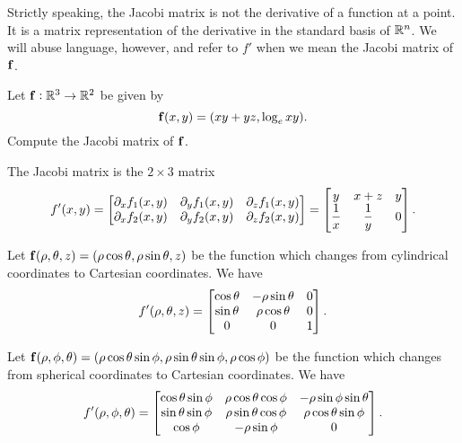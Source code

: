 \begin{rem}
Strictly speaking, the Jacobi matrix is not the derivative of a
function at a point. It is a matrix representation of the derivative
in the standard basis of $\mathbb{R}^n$. We will abuse language,
however, and refer to $f'$ when we mean the Jacobi matrix of $\mathbf{ f}$.
\end{rem}

\begin{exa}
Let $\mathbf{ f}:\mathbb{R}^3 \rightarrow \mathbb{R}^2$ be given by
$$\mathbf{ f}(x,y) = (xy + yz, \log_e xy).$$
Compute the Jacobi matrix of $\mathbf{ f}$.
\end{exa}
\begin{solu} The Jacobi matrix is the $2\times 3$ matrix
$$f'(x,y) = \begin{bmatrix} \partial_x f_1(x,y) &
\partial_y f_1(x,y) & \partial_z f_1(x,y) \cr
\partial_x f_2(x,y) & \partial_y f_2(x,y) &
\partial_z f_2(x,y) \cr \end{bmatrix} = \begin{bmatrix} y
& x + z & y \cr \dfrac{1}{x} & \dfrac{1}{y} & 0\cr
 \end{bmatrix}.$$
\end{solu}
\begin{exa}
Let $\mathbf{ f}(\rho, \theta, z)    = (\rho\cos\theta, \rho\sin\theta, z)$ be
the function which changes from cylindrical coordinates to Cartesian
coordinates. We have
$$f'(\rho, \theta, z) = \begin{bmatrix} \cos\theta
& -\rho\sin\theta & 0 \cr \sin\theta & \rho\cos\theta & 0 \cr 0 &
0 & 1 \cr
\end{bmatrix}.$$
\label{exa:jacobicylindrical}\end{exa}
\begin{exa}
Let $\mathbf{ f}(\rho, \phi, \theta)    = (\rho\cos\theta\sin\phi,
\rho\sin\theta\sin\phi, \rho\cos\phi)$ be the function which changes
from spherical coordinates to Cartesian coordinates. We have
$$f'(\rho, \phi, \theta)  = \begin{bmatrix}
\cos\theta\sin\phi & \rho\cos\theta\cos\phi &
-\rho\sin\phi\sin\theta \cr \sin\theta\sin\phi &
\rho\sin\theta\cos\phi & \rho\cos\theta\sin\phi \cr \cos\phi &
-\rho\sin\phi & 0 \cr
\end{bmatrix}.$$
\label{exa:jacobispherical}\end{exa}








